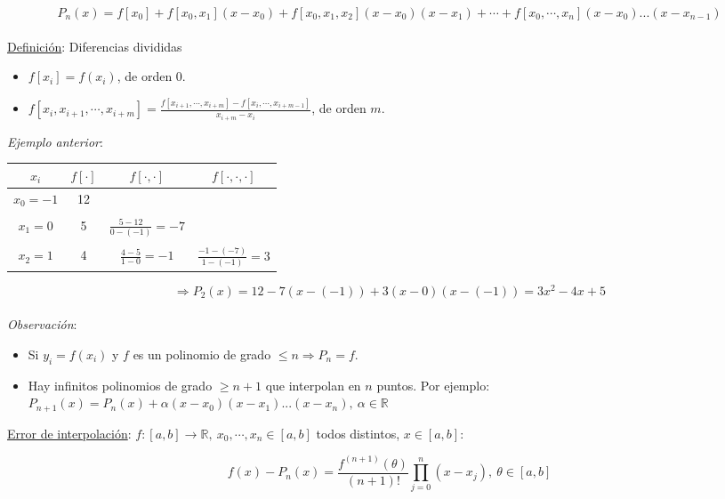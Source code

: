 $$P_{n}(x) = f[x_{0}] + f[x_{0}, x_{1}](x - x_{0}) + f[x_{0}, x_{1}, x_{2}](x - x_{0})(x - x_{1}) + \cdots + f[x_{0}, \cdots, x_{n}](x - x_{0})...(x - x_{n - 1})$$\\

\underline{Definici\'on}: Diferencias divididas

\begin{itemize}
    \item $f[x_{i}] = f(x_{i})$, de orden 0.
    \item $f[x_{i}, x_{i + 1}, \cdots, x_{i + m}] = \frac{f[x_{i + 1}, \cdots, x_{i + m}] - f[x_{i}, \cdots, x_{i + m - 1}]}{x_{i + m} - x_{i}}$, de orden $m$.\\
\end{itemize}

\newpage
\textit{Ejemplo anterior}:

\begin{table}[h]
    \centering
    \begin{tabular}{c|ccc}
        $x_{i} $ & $f[\cdot]$ & $f[\cdot, \cdot]$ & $f[\cdot, \cdot, \cdot]$\\ \hline
        $x_{0} = -1$ & 12 &  & \\
        &&&\\
        $x_{1} = 0$ & 5 & $\frac{5 - 12}{0 - (-1)} = -7$ & \\
        &&&\\
        $x_{2} = 1$ & 4 & $\frac{4 - 5}{1 - 0} = -1$ & $\frac{-1 - (-7)}{1 - (-1)} = 3$\\
    \end{tabular}
\end{table}

$$\Rightarrow P_{2}(x) = 12 - 7(x - (-1)) + 3(x - 0)(x - (-1)) = 3x^{2} - 4x + 5$$\\

\textit{Observaci\'on}:

\begin{itemize}
    \item Si $y_{i} = f(x_{i})$ y $f$ es un polinomio de grado $\leq n \Rightarrow P_{n} = f$.
    \item Hay infinitos polinomios de grado $\geq n + 1$ que interpolan en $n$ puntos. Por ejemplo: $P_{n + 1}(x) = P_{n}(x) + \alpha(x - x_{0})(x - x_{1})...(x - x_{n}),\ \alpha \in \mathbb{R}$\\
\end{itemize}

\underline{Error de interpolaci\'on}: $f:[a, b] \rightarrow \mathbb{R},\ x_{0}, \cdots, x_{n} \in [a, b]$ todos distintos, $x \in [a, b]$:

$$f(x) - P_{n}(x) = \frac{f^{(n + 1)}(\theta)}{(n + 1)!}\prod_{j = 0}^{n} (x - x_{j}),\ \theta \in [a, b]$$